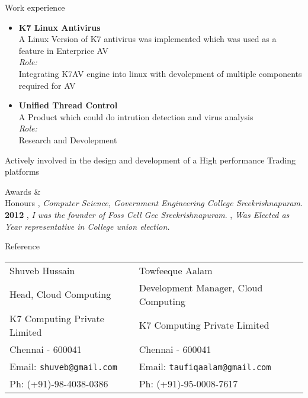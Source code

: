 \documentclass{resume}
\begin{document}
\begin{category}{Work experience}
\begin{itemize}
  \item{{\bfseries K7 Linux Antivirus}\\
  A Linux Version of K7 antivirus was implemented which was used as a feature in Enterprice AV\\
  {\it Role:}\\
  Integrating K7AV engine into linux with devolepment of multiple components required for AV
  }

  \item {{\bfseries Unified Thread Control}\\
  A Product which could do intrution detection and virus analysis \\
  {\it Role:}\\
  Research and Devolepment\\
  }

  \end{itemize}
  \citemnobullet Actively involved in the design and development of a High performance Trading platforms
\end{category}


\begin{category}{Awards \&\\ Honours}
  , {\em Computer Science, Government Engineering College Sreekrishnapuram}. \hfill \textbf{2012}
  , {\em I was the founder of Foss Cell Gec Sreekrishnapuram}.
  , {\em Was Elected as Year representative in College union election.}
\end{category}



\begin{category}{Reference}
  \citemnobullet \\
  \begin{tabular}{ll}Shuveb Hussain&Towfeeque Aalam\\
    Head, Cloud Computing&Development Manager, Cloud Computing\\
    K7 Computing Private Limited&K7 Computing Private Limited\\
    Chennai - 600041&Chennai - 600041\\
    Email: \mbox{\small\tt shuveb@gmail.com}&Email: \mbox{\small\tt taufiqaalam@gmail.com}\\
    Ph: (+91)-98-4038-0386&Ph: (+91)-95-0008-7617
  \end{tabular}
\end{category}
\end{document}
